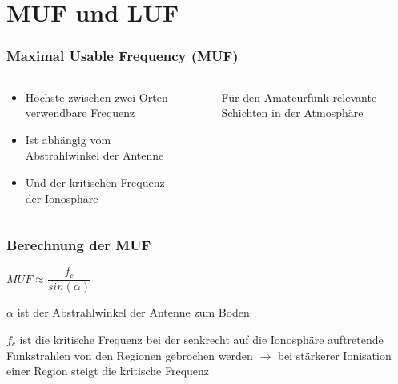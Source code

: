 
\section{MUF und LUF}
\label{section:muf_luf_1}
\begin{frame}%

\frametitle{Maximal Usable Frequency (MUF)}
\begin{columns}
    \begin{column}{0.48\textwidth}
    \begin{itemize}
  \item Höchste zwischen zwei Orten verwendbare Frequenz
  \item Ist abhängig vom Abstrahlwinkel der Antenne
  \item Und der kritischen Frequenz der Ionosphäre
  \end{itemize}

    \end{column}
   \begin{column}{0.48\textwidth}
       
\begin{figure}
    \caption{\scriptsize Für den Amateurfunk relevante Schichten in der Atmosphäre}
    \label{e_atmosphaeren_schichten}
\end{figure}


   \end{column}
\end{columns}

\end{frame}

\begin{frame}
\frametitle{Berechnung der MUF}
$MUF \approx \dfrac{f_c}{sin(\alpha)}$

$\alpha$ ist der Abstrahlwinkel der Antenne zum Boden

$f_c$ ist die kritische Frequenz bei der senkrecht auf die Ionosphäre auftretende Funkstrahlen von den Regionen gebrochen werden $\rightarrow$ bei stärkerer Ionisation einer Region steigt die kritische Frequenz

\end{frame}

\begin{frame}
\end{frame}

